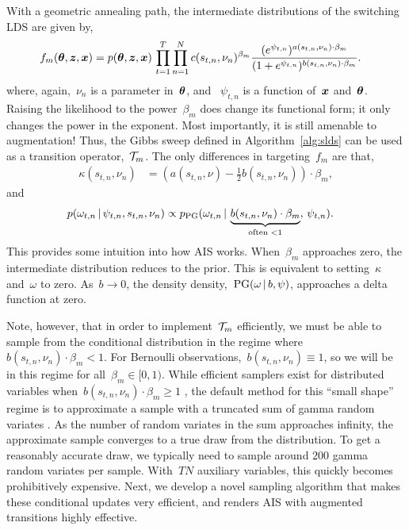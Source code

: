 With a geometric annealing path, the intermediate distributions of the 
switching LDS are given by,
\begin{align}
  \label{eq:intermediate}
  f_m(\boldsymbol{\theta}, \boldsymbol{z}, \boldsymbol{x}) 
  &= p(\boldsymbol{\theta}, \boldsymbol{z}, \boldsymbol{x}) \,  
    \prod_{t=1}^T \prod_{n=1}^N
    c(s_{t,n}, \nu_n)^{\beta_m} \frac{(e^{\psi_{t,n}})^{a(s_{t,n}, \nu_n) \cdot \beta_m}}
    {(1+e^{\psi_{t,n}})^{b(s_{t,n}, \nu_n) \cdot \beta_m}}.
\end{align}
where, again,~$\nu_n$ is a parameter in~$\boldsymbol{\theta}$, and ~$\psi_{t,n}$
is a function of~$\boldsymbol{x}$ and~$\boldsymbol{\theta}$.  Raising the likelihood to the
power~$\beta_m$ does change its functional form; it only changes the
power in the exponent.  Most importantly, it is still amenable to
\polyagamma augmentation!  Thus, the Gibbs sweep defined in
Algorithm~\ref{alg:slds} can be used as a transition
operator,~$\mathcal{T}_m$. The only differences in targeting~$f_m$ are that,
\begin{align*}
  \kappa(s_{t,n}, \nu_n) &= \left(a(s_{t,n}, \nu) - \frac{1}{2} b(s_{t,n}, \nu_n) \right) \cdot \beta_m,
\end{align*}
and
\begin{align*}
  \nonumber
  p({\omega}_{t,n} \,|\, \psi_{t,n}, s_{t,n}, \nu_n) 
  &\propto p_{\mathrm{PG}}({\omega}_{t,n} \,|\,
  \underbrace{b(s_{t,n}, \nu_n) \cdot \beta_m}_{\text{often } < 1}, \, \psi_{t,n}).
\end{align*}
This provides some intuition into how AIS works. When~$\beta_m$
approaches zero, the intermediate distribution reduces to the
prior. This is equivalent to setting~$\kappa$ and~$\omega$ to
zero. As~$b \to 0$, the density
\polyagamma density,~$\mathrm{PG}(\omega \,|\, b, \psi)$, approaches a
delta function at zero.

Note, however, that in order to implement~$\mathcal{T}_m$ efficiently, we
must be able to sample from the \polyagamma conditional distribution
in the regime where~${b(s_{t,n}, \nu_n) \cdot \beta_m < 1}$.  For
Bernoulli observations,~${b(s_{t,n}, \nu_n) \equiv 1}$, so we will be
in this regime for all~$\beta_m \in [0,1)$.  While efficient samplers
exist for \polyagamma distributed variables when~${b(s_{t,n}, \nu_n) \cdot \beta_m \geq 1}$ 
\citep{windle2014sampling}, the
default method for this ``small shape'' regime is to approximate a
\polyagamma sample with a truncated sum of gamma random variates
\citep{polson2013bayesian}.  As the number of random variates in the
sum approaches infinity, the approximate sample converges to a true
draw from the \polyagamma distribution. To get a reasonably accurate
draw, we typically need to sample around $200$ gamma random variates per
\polyagamma sample.  With~$TN$ auxiliary variables, this quickly
becomes prohibitively expensive. Next, we develop a novel sampling
algorithm that makes these conditional updates very efficient, and
renders AIS with \polyagamma augmented transitions highly effective.

